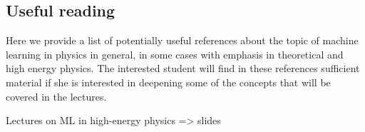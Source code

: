 \documentclass[12pt]{article}
\numberwithin{equation}{section}
\begin{document}
\begin{spacing}{1.1}
\section{Useful reading}

Here we provide a list of potentially useful references about the topic
of machine learning in physics in general, in some cases with emphasis
in theoretical and high energy physics.
%
The interested student will find in these references sufficient material if
she is interested in deepening some of the concepts that will be covered in the lectures.

Lectures on ML in high-energy physics => slides

\end{spacing}
\end{document}
